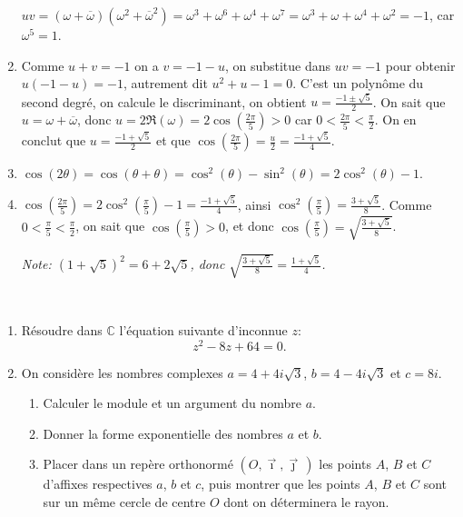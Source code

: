 \documentclass[a4paper,12pt]{exam}
\begin{document}
\begin{questions}
\begin{solution}
\begin{enumerate}
 $uv=(\omega+\overline\omega)(\omega^2+\overline\omega^2)=\omega^3+\omega^6+\omega^4+\omega^7=\omega^3+\omega+\omega^4+\omega^2=-1$, car $\omega^5=1$.
 \item Comme $u+v=-1$ on a $v=-1-u$, on substitue dans $uv=-1$ pour obtenir $u(-1-u)=-1$, autrement dit $u^2+u-1=0$. C'est un polynôme du second degré, on calcule le discriminant, on obtient $u=\tfrac{-1\pm\sqrt5}2$. On sait que $u=\omega+\overline\omega$, donc $u=2\Re(\omega)=2\cos(\tfrac{2\pi}5)>0$ car $0<\tfrac{2\pi}5<\tfrac\pi2$. On en conclut que $u=\tfrac{-1+\sqrt5}2$ et que $\cos(\tfrac{2\pi}5)=\tfrac u2=\tfrac{-1+\sqrt5}4$. 
 \item $\cos(2\theta)=\cos(\theta+\theta)=\cos^2(\theta)-\sin^2(\theta)=2\cos^2(\theta)-1$.
 \item $\cos(\tfrac{2\pi}5)=2\cos^2(\tfrac\pi5)-1=\tfrac{-1+\sqrt5}4$, ainsi $\cos^2(\tfrac\pi5)=\tfrac{3+\sqrt5}8$. Comme $0<\tfrac\pi5<\tfrac\pi2$, on sait que $\cos(\tfrac\pi5)>0$, et donc $\cos(\tfrac\pi5)=\sqrt{\tfrac{3+\sqrt5}8}$.
 
 \emph{Note: $(1+\sqrt5)^2=6+2\sqrt5$, donc $\sqrt{\tfrac{3+\sqrt5}8}=\tfrac{1+\sqrt5}4$.}
\end{enumerate}
\end{solution}
\ \vfill
\question\ 
\begin{enumerate}
 \item Résoudre dans $\mathbb C$ l'équation suivante d'inconnue $z$:
$$z^2-8z+64=0.$$

 \item On considère les nombres complexes $a=4+4i\sqrt{3}$, $b=4-4i\sqrt{3}$ et $c= 8i$.
 
 \begin{enumerate}
 \item Calculer le module et un argument du nombre $a$.
 \item Donner la forme exponentielle des nombres $a$ et $b$.
 \item Placer dans un repère orthonormé $\left(O,\vec\imath,\vec\jmath\,\right)$ les points $A$, $B$ et $C$ d'affixes respectives $a$, $b$ et $c$, puis montrer que les points $A$, $B$ et $C$ sont sur un même cercle de centre $O$ dont on déterminera le rayon.
 \end{enumerate}
 

\end{enumerate}
\end{questions}
\end{document}
